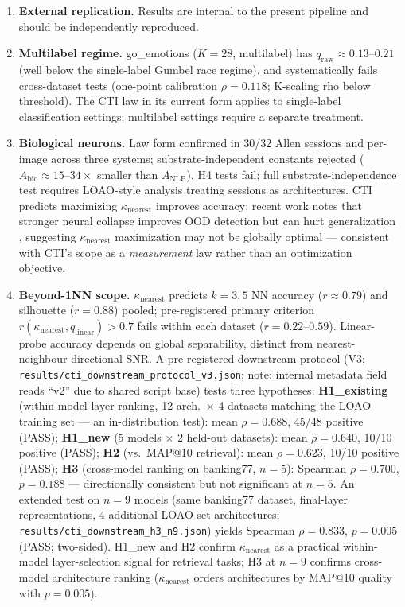 \documentclass{article}
\begin{document}
\begin{enumerate}
\item \textbf{External replication.} Results are internal to the present pipeline and should be independently reproduced.
\item \textbf{Multilabel regime.} go\_emotions ($K=28$, multilabel) has $q_\mathrm{raw}\approx0.13$--$0.21$ (well below the single-label Gumbel race regime), and systematically fails cross-dataset tests (one-point calibration $\rho=0.118$; K-scaling rho below threshold). The CTI law in its current form applies to single-label classification settings; multilabel settings require a separate treatment.
\item \textbf{Biological neurons.} Law form confirmed in 30/32 Allen sessions and per-image across three systems; substrate-independent constants rejected ($A_\mathrm{bio}\approx15$--$34\times$ smaller than $A_\mathrm{NLP}$). H4 tests fail; full substrate-independence test requires LOAO-style analysis treating sessions as architectures. CTI predicts maximizing $\kappa_\mathrm{nearest}$ improves accuracy; recent work notes that stronger neural collapse improves OOD detection but can hurt generalization \citep{harun2025}, suggesting $\kappa_\mathrm{nearest}$ maximization may not be globally optimal --- consistent with CTI's scope as a \emph{measurement} law rather than an optimization objective.
\item \textbf{Beyond-1NN scope.} $\kappa_\mathrm{nearest}$ predicts $k=3,5$ NN accuracy ($r\approx0.79$) and silhouette ($r=0.88$) pooled; pre-registered primary criterion $r(\kappa_\mathrm{nearest}, q_\mathrm{linear})>0.7$ fails within each dataset ($r=0.22$--$0.59$). Linear-probe accuracy depends on global separability, distinct from nearest-neighbour directional SNR. A pre-registered downstream protocol (V3; \texttt{results/cti\_downstream\_protocol\_v3.json}; note: internal metadata field reads ``v2'' due to shared script base) tests three hypotheses: \textbf{H1\_existing} (within-model layer ranking, 12 arch.\ $\times$ 4 datasets matching the LOAO training set --- an in-distribution test): mean $\rho=0.688$, 45/48 positive (PASS); \textbf{H1\_new} (5 models $\times$ 2 held-out datasets): mean $\rho=0.640$, 10/10 positive (PASS); \textbf{H2} (vs.\ MAP@10 retrieval): mean $\rho=0.623$, 10/10 positive (PASS); \textbf{H3} (cross-model ranking on banking77, $n=5$): Spearman $\rho=0.700$, $p=0.188$ --- directionally consistent but not significant at $n=5$. An extended test on $n=9$ models (same banking77 dataset, final-layer representations, 4 additional LOAO-set architectures; \texttt{results/cti\_downstream\_h3\_n9.json}) yields Spearman $\rho=0.833$, $p=0.005$ (PASS; two-sided). H1\_new and H2 confirm $\kappa_\mathrm{nearest}$ as a practical within-model layer-selection signal for retrieval tasks; H3 at $n=9$ confirms cross-model architecture ranking ($\kappa_\mathrm{nearest}$ orders architectures by MAP@10 quality with $p=0.005$).

\end{enumerate}
\end{document}
